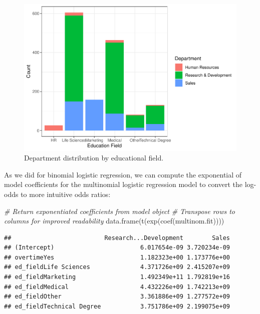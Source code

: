 \documentclass[
]{book}
\newenvironment{Shaded}{\begin{snugshade}}{\end{snugshade}}
\newcommand{\CommentTok}[1]{\textcolor[rgb]{0.56,0.35,0.01}{\textit{#1}}}
\newcommand{\FunctionTok}[1]{\textcolor[rgb]{0.00,0.00,0.00}{#1}}
\newcommand{\NormalTok}[1]{#1}
\begin{document}
\begin{figure}

{\centering \includegraphics[width=1\linewidth]{People_Analytics_Lifecycle_files/figure-latex/ed-field-dept-1} 

}

\caption{Department distribution by educational field.}\label{fig:ed-field-dept}
\end{figure}

As we did for binomial logistic regression, we can compute the exponential of model coefficients for the multinomial logistic regression model to convert the log-odds to more intuitive odds ratios:

\begin{Shaded}
\begin{Highlighting}[]
\CommentTok{\# Return exponentiated coefficients from model object}
\CommentTok{\# Transpose rows to columns for improved readability}
\FunctionTok{data.frame}\NormalTok{(}\FunctionTok{t}\NormalTok{(}\FunctionTok{exp}\NormalTok{(}\FunctionTok{coef}\NormalTok{(multinom.fit))))}
\end{Highlighting}
\end{Shaded}

\begin{verbatim}
##                          Research...Development        Sales
## (Intercept)                        6.017654e-09 3.720234e-09
## overtimeYes                        1.182323e+00 1.173776e+00
## ed_fieldLife Sciences              4.371726e+09 2.415207e+09
## ed_fieldMarketing                  1.492349e+11 1.792819e+16
## ed_fieldMedical                    4.432226e+09 1.742213e+09
## ed_fieldOther                      3.361886e+09 1.277572e+09
## ed_fieldTechnical Degree           3.751786e+09 2.199075e+09
\end{verbatim}
\end{document}
